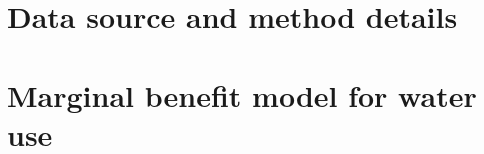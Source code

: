 \documentclass[preprint, 12pt]{elsarticle}
\begin{document}
\newpage
\section{Data source and method details}\label{secS2}
\renewcommand{\thefigure}{B\arabic{figure}}
\renewcommand{\thetable}{B\arabic{table}}
\setcounter{figure}{0}
\setcounter{table}{0}


% 

\newpage
\section{Marginal benefit model for water use}\label{secS4}
\renewcommand{\thefigure}{C\arabic{figure}}
\renewcommand{\thetable}{C\arabic{table}}
\setcounter{figure}{0}
\setcounter{table}{0}


% 
\end{document}

